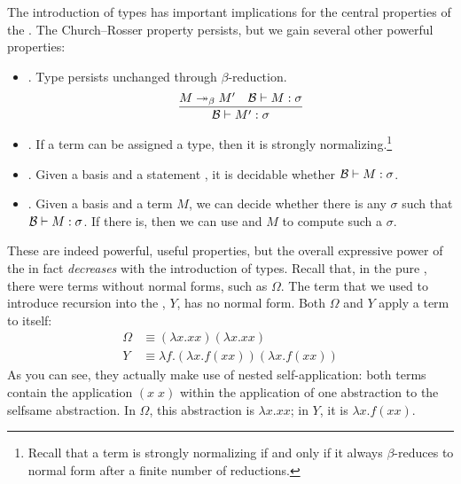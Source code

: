 The introduction of types has important implications for the central properties of the \lambdacalc{}. The Church--Rosser property persists, but we gain several other powerful properties:
\begin{itemize}
\item {}. Type persists unchanged through $\beta$-re\-duc\-tion.
\[
\frac{M \betared[*] M\prime \quad \basis \turnstile \stmt{M}{\sigma}}%
{\basis \turnstile \stmt{M\prime}{\sigma}}
\]

\item {}. If a term can be assigned a type, then it is strongly normalizing.\footnote{Recall that a term is strongly normalizing if and only if it always $\beta$-reduces to normal form after a finite number of reductions.}

\item {}. Given a basis \basis{} and a statement , it is decidable whether $\basis \turnstile \stmt{M}{\sigma}$.

\item {}. Given a basis \basis{} and a term $M$, we can decide whether there is any $\sigma$ such that $\basis \turnstile \stmt{M}{\sigma}$. If there is, then we can use \basis{} and $M$ to compute such a $\sigma$.
\end{itemize}

These are indeed powerful, useful properties, but the overall expressive power of the \lambdacalc in fact \emph{decreases} with the introduction of types. Recall that, in the pure \lambdacalc{}, there were terms without normal forms, such as $\Omega$. The term that we used to introduce recursion into the \lambdacalc{}, $Y$, has no normal form. Both $\Omega$ and $Y$ apply a term to itself:
\begin{align*}
\Omega &\equiv (\lambda x.xx)(\lambda x.xx)\\
Y &\equiv \lambda f.(\lambda x. f (x x))(\lambda x. f (x x))
\end{align*}
As you can see, they actually make use of nested self-ap\-pli\-ca\-tion: both terms contain the application $(x\; x)$ within the application of one abstraction to the selfsame abstraction. In $\Omega$, this abstraction is $\lambda x. xx$; in $Y$, it is $\lambda x. f (x x)$.

